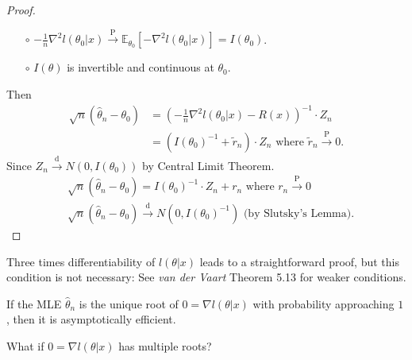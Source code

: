 \documentclass[a4paper]{article}
\begin{document}
\begin{proof}
\begin{itemize}
		\item[$\circ$] $-\frac{1}{n} \nabla^2 l(\theta_0 | x) \stackrel{\text{P}}{\longrightarrow} \mathbb{E}_{\theta_0}[-\nabla^2 l(\theta_0 | x)] = I(\theta_0)$.
		\item[$\circ$] $I(\theta)$ is invertible and continuous at $\theta_0$.
	\end{itemize}
	Then 
	\begin{equation}
		\begin{aligned}
			\sqrt{n}(\hat{\theta}_n - \theta_0) &= \left(-\frac{1}{n} \nabla^2 l(\theta_0|x) - R(x)\right)^{-1} \cdot Z_n \\
			&= (I(\theta_0)^{-1}+\tilde{r}_n) \cdot Z_n \text{ where } \tilde{r}_n \stackrel{\text{P}}{\longrightarrow} 0.
		\end{aligned}
	\end{equation}
	Since $Z_n \stackrel{\text{d}}{\longrightarrow} N(0,I(\theta_0))$ by Central Limit Theorem.
	\begin{equation}
		\begin{aligned}
			& \sqrt{n}(\hat{\theta}_n - \theta_0) = I(\theta_0)^{-1} \cdot Z_n + r_n \text{ where } r_n \stackrel{\text{P}}{\longrightarrow} 0\\
			& \sqrt{n}(\hat{\theta}_n - \theta_0) \stackrel{\text{d}}{\longrightarrow} N(0,I(\theta_0)^{-1}) \text{ (by Slutsky's Lemma)}.
		\end{aligned}
	\end{equation}
\end{proof}

\begin{remark}
	Three times differentiability of $l(\theta|x)$ leads to a straightforward proof, but this condition is not necessary: See \emph{van der Vaart} Theorem 5.13 for weaker conditions.
\end{remark}

\begin{cor}
	If the MLE $\hat{\theta}_n$ is the unique root of $0 = \nabla l(\theta|x)$ with probability approaching $1$, then it is asymptotically efficient.
\end{cor}

\begin{question}
	What if $0 = \nabla l(\theta|x)$ has multiple roots?
\end{question}
\end{document}
